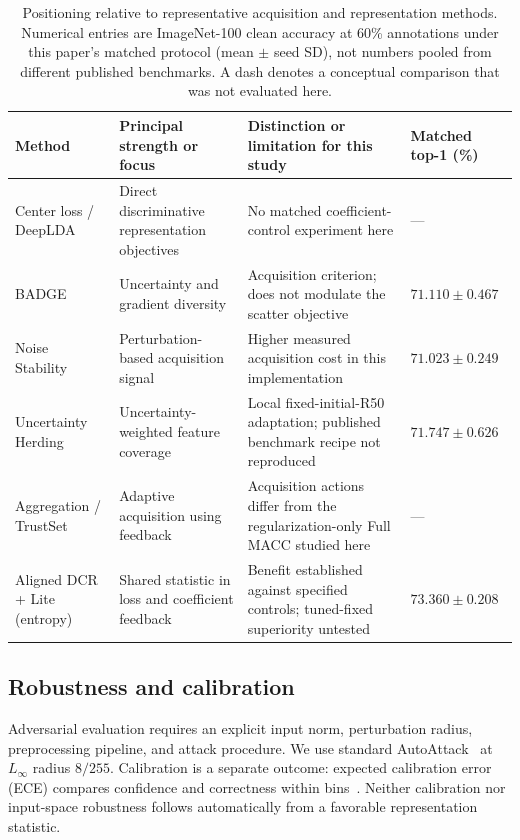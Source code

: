 \documentclass[a4paper,fleqn]{cas-dc}
\let\CAENLcaption\caption
\let\caption\CAENLcaption
\begin{document}
\begin{table}[pos=tbp]
\caption{Positioning relative to representative acquisition and representation
methods. Numerical entries are ImageNet-100 clean accuracy at 60\% annotations
under this paper's matched protocol (mean $\pm$ seed SD), not numbers pooled
from different published benchmarks. A dash denotes a conceptual comparison
that was not evaluated here.}
\label{tab:related_positioning}
\centering\small
\begin{tabularx}{\textwidth}{@{}p{}YYp{.14\textwidth}@{}}
\toprule
Method & Principal strength or focus & Distinction or limitation for this study & Matched top-1 (\%) \\
\midrule
Center loss / DeepLDA~\cite{wen2016center,dorfer2016deeplda} &
Direct discriminative representation objectives &
No matched coefficient-control experiment here & --- \\
BADGE~\cite{ash2020badge} & Uncertainty and gradient diversity &
Acquisition criterion; does not modulate the scatter objective & $71.110\pm0.467$ \\
Noise Stability~\cite{li2024noise} & Perturbation-based acquisition signal &
Higher measured acquisition cost in this implementation & $71.023\pm0.249$ \\
Uncertainty Herding~\cite{bae2025uncertainty} & Uncertainty-weighted feature coverage &
Local fixed-initial-R50 adaptation; published benchmark recipe not reproduced & $71.747\pm0.626$ \\
Aggregation / TrustSet~\cite{jung2026aggregation,cui2026trustset} &
Adaptive acquisition using feedback & Acquisition actions differ from the regularization-only Full MACC studied here & --- \\
Aligned DCR + Lite (entropy) & Shared statistic in loss and coefficient feedback &
Benefit established against specified controls; tuned-fixed superiority untested & $73.360\pm0.208$ \\
\bottomrule
\end{tabularx}
\end{table}

\subsection{Robustness and calibration}

Adversarial evaluation requires an explicit input norm, perturbation
radius, preprocessing pipeline, and attack procedure. We use standard
AutoAttack~\cite{croce2020autoattack} at $L_\infty$ radius $8/255$.
Calibration is a separate outcome: expected calibration error
(ECE) compares confidence and correctness within
bins~\cite{guo2017calibration}. Neither calibration nor input-space
robustness follows automatically from a favorable representation
statistic.
\end{document}
